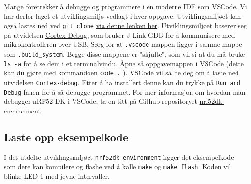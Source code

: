Mange foretrekker å debugge og programmere i en moderne IDE som VSCode. Vi har derfor laget et utviklingsmiljø vedlagt i hver oppgave. Utviklingsmiljøet kan også lastes ned ved \verb|git clone| \href{https://github.com/ITK-TTK4235/nrf52dk-environment}{via denne lenken her}. Utviklingsmiljøet baserer seg på utvidelsen \href{https://open-vsx.org/extension/marus25/cortex-debug}{Cortex-Debug}, som bruker J-Link GDB for å kommunisere med mikrokontrolleren over USB. Sørg for at \verb|.vscode|-mappen ligger i samme mappe som \verb|.build_system|. Begge disse mappene er "skjulte", som vil si at du må bruke \verb|ls -a| for å se dem i et terminalvindu. Åpne så oppgavemappen i VSCode (dette kan du gjøre med kommandoen \verb|code .| ). VSCode vil så be deg om å laste ned utvidelsen \verb|Cortex-debug|. Etter å ha installert denne kan du trykke på \verb|Run and Debug|-fanen for å så debugge programmet. For mer informasjon om hvordan man debugger nRF52 DK i VSCode, ta en titt på Github-repositoryet \href{https://github.com/ITK-TTK4235/nrf52dk-environment}{nrf52dk-environment}.

\subsection{Laste opp eksempelkode}
I det utdelte utviklingsmiljøet \verb|nrf52dk-environment| ligger det eksempelkode som dere kan kompilere og flashe ved å kalle \verb|make| og \verb|make flash|. Koden vil blinke LED 1 med jevne intervaller. 



